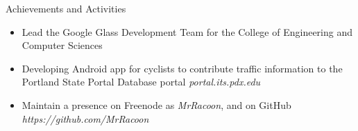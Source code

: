 \documentclass[11pt,oneside]{article}
\newenvironment{ressection}[1]{
    \vspace{4pt}
    {\fontfamily{phv}\selectfont\Large#1}
    \begin{itemize}
    \vspace{3pt}
}{
    \end{itemize}
}
\newcommand{\resitem}[1]{
    \vspace{-4pt}
    \item \begin{flushleft} #1 \end{flushleft}
}
\begin{document}
\begin{ressection}{Achievements and Activities}
    \resitem{Lead the Google Glass Development Team for the College of Engineering and Computer Sciences}
    \resitem{Developing Android app for cyclists to contribute traffic information to the Portland State Portal Database portal \textit{portal.its.pdx.edu}}
    \resitem{Maintain a presence on Freenode as \textit{MrRacoon}, and on GitHub \textit{https://github.com/MrRacoon}}
\end{ressection}
\end{document}
